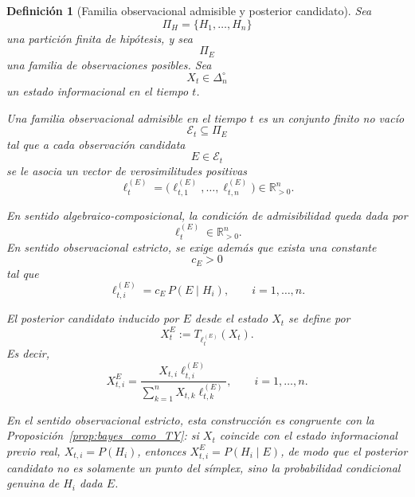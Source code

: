 ﻿\documentclass[12pt]{article}
\newtheorem{definicion}{Definición}[section]
\begin{document}
\begin{definicion}[Familia observacional admisible y posterior candidato]
Sea
\[
\Pi_H=\{H_1,\dots,H_n\}
\]
una partición finita de hipótesis, y sea
\[
\Pi_E
\]
una familia de observaciones posibles. Sea
\[
X_t\in\Delta_n^\circ
\]
un estado informacional en el tiempo \(t\).

Una \emph{familia observacional admisible} en el tiempo \(t\) es un conjunto finito no vacío
\[
\mathcal E_t\subseteq \Pi_E
\]
tal que a cada observación candidata
\[
E\in\mathcal E_t
\]
se le asocia un vector de verosimilitudes positivas
\[
\ell_t^{(E)}
=
\bigl(\ell_{t,1}^{(E)},\dots,\ell_{t,n}^{(E)}\bigr)
\in\mathbb R_{>0}^n.
\]

En sentido algebraico-composicional, la condición de admisibilidad queda dada por
\[
\ell_t^{(E)}\in\mathbb R_{>0}^n.
\]
En sentido observacional estricto, se exige además que exista una constante
\[
c_E>0
\]
tal que
\[
\ell_{t,i}^{(E)}
=
c_E\,P(E\mid H_i),
\qquad
i=1,\dots,n.
\]

El \emph{posterior candidato} inducido por \(E\) desde el estado \(X_t\) se define por
\[
X_t^E
:=
T_{\ell_t^{(E)}}(X_t).
\]
Es decir,
\[
X_{t,i}^E
=
\frac{
X_{t,i}\ell_{t,i}^{(E)}
}{
\sum_{k=1}^n X_{t,k}\ell_{t,k}^{(E)}
},
\qquad
i=1,\dots,n.
\]

En el sentido observacional estricto, esta construcción es congruente con la Proposición~\ref{prop:bayes_como_TY}: si \(X_t\) coincide con el estado informacional previo real, \(X_{t,i}=P(H_i)\), entonces \(X_{t,i}^E=P(H_i\mid E)\), de modo que el posterior candidato no es solamente un punto del símplex, sino la probabilidad condicional genuina de \(H_i\) dada \(E\).
\end{definicion}
\end{document}
